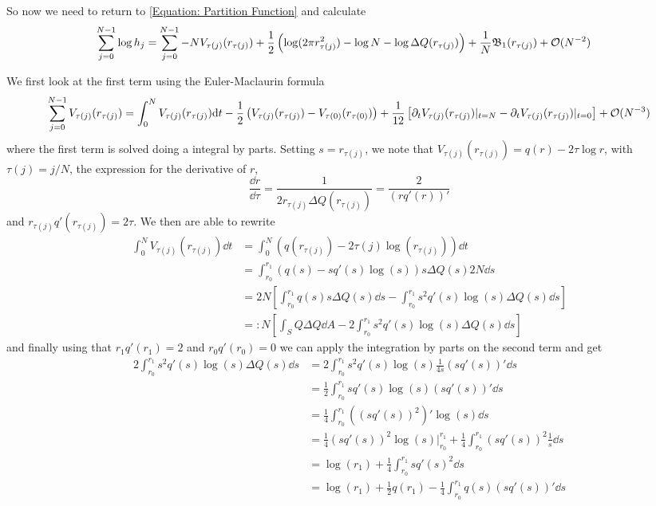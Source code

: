 So now we need to return to  \ref{Equation: Partition Function} and calculate 
\begin{align}
	\sum_{j=0}^{N-1} \log{h_j} & = \sum_{j=0}^{N-1} -N V_{\tau(j)}(r_{\tau(j)}) + \frac{1}{2} \left(\log(2\pi r^2_{\tau(j)}) - \log N - \log \Delta Q(r_{\tau(j)}) \right) + \frac{1}{N} \mathfrak{B}_1(r_{\tau(j)}) + \mathcal{O}(N^{-2}) 
\end{align}

We first look at the first term using the Euler-Maclaurin formula
\begin{equation}
	\sum_{j=0}^{N-1} V_{\tau(j)}(r_{\tau(j)}) = \int_0^N V_{\tau(j)}(r_{\tau(j)})  \mathrm{d} t - \frac{1}{2} \left( V_{\tau(j)}(r_{\tau(j)})  - V_{\tau(0)}(r_{\tau(0)}) \right) + \frac{1}{12} \left[ \partial_t V_{\tau(j)}(r_{\tau(j)}) |_{t=N} - \partial_t V_{\tau(j)}(r_{\tau(j)}) |_{t=0} \right] + \mathcal{O}(N^{-3})
\end{equation}
where the first term is solved doing a integral by parts. Setting $s = r_{\tau(j)}$, we note that $V_{\tau(j)}(r_{\tau(j)}) = q(r) - 2 \tau \log r$, with $\tau(j) = j/N$, the expression for the derivative of $r$, 
\begin{equation}
	\frac{\dd r}{\dd \tau} = \frac{1}{2 r_{\tau(j)} \Delta Q(r_{\tau(j)})} = \frac{2}{(r q'(r))'}
\end{equation}
and $r_{\tau(j)} q'(r_{\tau(j)}) = 2 \tau$. We then are able to rewrite
\begin{align}
	\int_0^N V_{\tau(j)}(r_{\tau(j)})  \dd t & = \int_0^N (q(r_{\tau(j)}) - 2 \tau(j) \log(r_{\tau(j)})) \dd t \\
	& = \int_{r_0}^{r_1} (q(s) - s q'(s) \log(s)) s \Delta Q(s) 2 N \dd s \\
	& = 2 N \left[ \int_{r_0}^{r_1} q(s) s \Delta Q(s)\dd s - \int_{r_0}^{r_1} s^2 q'(s) \log(s) \Delta Q(s) \dd s \right]\\
	& =: N \left[ \int_S Q \Delta Q \dd A - 2 \int_{r_0}^{r_1} s^2 q'(s) \log(s) \Delta Q(s) \dd s \right]
\end{align}
and finally using that $r_1 q'(r_1) = 2$ and $r_0 q'(r_0) = 0$ we can apply the integration by parts on the second term and get
\begin{align}
	2 \int_{r_0}^{r_1} s^2 q'(s) \log(s) \Delta Q(s) \dd s & = 2 \int_{r_0}^{r_1} s^2 q'(s) \log(s) \frac{1}{4s} (s q'(s))' \dd s \\
	&= \frac{1}{2} \int_{r_0}^{r_1} s q'(s) \log(s) (s q'(s))' \dd s \\
	& = \frac{1}{4} \int_{r_0}^{r_1} ((sq'(s))^2)' \log(s) \dd s \\
	& = \frac{1}{4} (s q'(s))^2 \log(s) |_{r_0}^{r_1} + \frac{1}{4}  \int_{r_0}^{r_1} (s q'(s))^2 \frac{1}{s} \dd s \\
	& = \log(r_1) + \frac{1}{4} \int_{r_0}^{r_1} s q'(s)^2 \dd s \\
	& = \log(r_1) + \frac{1}{2} q(r_1) - \frac{1}{4} \int_{r_0}^{r_1} q(s) (s q'(s))' \dd s
\end{align}
